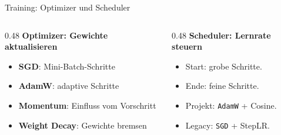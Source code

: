 \begin{frame}{Training: Optimizer und Scheduler}
\scriptsize
\begin{columns}[T,onlytextwidth]
\begin{column}{0.48\textwidth}
\textbf{Optimizer: Gewichte aktualisieren}
\begin{itemize}\setlength\itemsep{0.06em}
    \item \textbf{SGD}: Mini-Batch-Schritte
    \item \textbf{AdamW}: adaptive Schritte
    \item \textbf{Momentum}: Einfluss vom Vorschritt
    \item \textbf{Weight Decay}: Gewichte bremsen
\end{itemize}
\end{column}
\begin{column}{0.48\textwidth}
\textbf{Scheduler: Lernrate steuern}
\begin{itemize}\setlength\itemsep{0.06em}
    \item Start: grobe Schritte.
    \item Ende: feine Schritte.
    \item Projekt: \texttt{AdamW} + Cosine.
    \item Legacy: \texttt{SGD} + StepLR.
\end{itemize}
\end{column}
\end{columns}
\end{frame}
